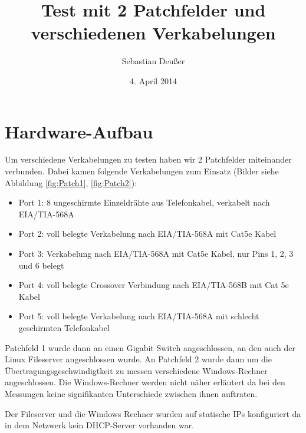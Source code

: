 \documentclass[12pt,a4paper,titlepage]{scrartcl} %
\title{Test mit 2 Patchfelder und verschiedenen Verkabelungen}
\author{Sebastian Deußer}
\date{4. April 2014} %
\begin{document}
\maketitle %

\pagestyle{fancy}
\lhead{}
\chead{\leftmark}
\rhead{}
\cfoot{}

\thispagestyle{fancy}

\section{Hardware-Aufbau}
Um verschiedene Verkabelungen zu testen haben wir 2 Patchfelder miteinander verbunden. Dabei kamen folgende Verkabelungen zum Einsatz (Bilder siehe Abbildung \ref{fig:Patch1}, \ref{fig:Patch2}):
\begin{itemize}
\item Port 1: 8 ungeschirmte Einzeldrähte aus Telefonkabel, verkabelt nach EIA/TIA-568A
\item Port 2: voll belegte Verkabelung nach EIA/TIA-568A mit Cat5e Kabel
\item Port 3: Verkabelung nach EIA/TIA-568A mit Cat5e Kabel, nur Pins 1, 2, 3 und 6 belegt
\item Port 4: voll belegte Crossover Verbindung nach EIA/TIA-568B mit Cat 5e Kabel
\item Port 5: voll belegte Verkabelung nach EIA/TIA-568A mit schlecht geschirmten Telefonkabel
\end{itemize}
Patchfeld 1 wurde dann an einen Gigabit Switch angeschlossen, an den auch der Linux Fileserver angeschlossen wurde. An Patchfeld 2 wurde dann um die Übertragungsgeschwindigtkeit zu messen verschiedene Windows-Rechner angeschlossen. Die Windows-Rechner werden nicht näher erläutert da bei den Messungen keine signifikanten Unterschiede zwischen ihnen auftraten.

Der Fileserver und die Windows Rechner wurden auf statische IPs konfiguriert da in dem Netzwerk kein DHCP-Server vorhanden war.\newpage
\end{document}
